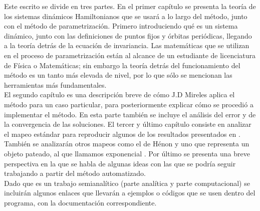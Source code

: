 Este escrito se divide en tres partes. En el primer capítulo se presenta la teoría de los sistemas dinámicos Hamiltonianos que se usará a lo largo del método, junto con el método de parametrización. Primero introduciendo qué es un sistema dinámico, junto con las definiciones de puntos fijos y órbitas periódicas, llegando a la teoría detrás de la ecuación de invariancia. Las matemáticas que se utilizan en el proceso de parametrización están al alcance de un estudiante de licenciatura de Física o Ma\-te\-má\-ti\-cas; sin embargo la teoría detrás del funcionamiento del método es un tanto más elevada de nivel, por lo que sólo se mencionan las herramientas más fundamentales.  \\


El segundo capítulo es una descripción breve de cómo J.D Mireles aplica el método para un caso particular, para posteriormente explicar cómo se procedió a implementar el método. En esta parte también se incluye el análisis del error y de la convergencia de las soluciones. El tercer y último capítulo consiste en analizar el mapeo estándar para reproducir algunos de los resultados presentados en \cite{Mireles}. También se analizarán otros mapeos como el de Hénon y uno que representa un objeto pateado, al que llamamos exponencial \cite{Jung}. Por último se presenta una breve perspectiva en la que se habla de algunas ideas con las que se podría seguir trabajando a partir del método automatizado. \\

Dado que es un trabajo semianalítico (parte analítica y parte computacional) se incluirán algunos enlaces que llevarán a ejemplos o códigos que se usen dentro del programa, con la documentación correspondiente. 

